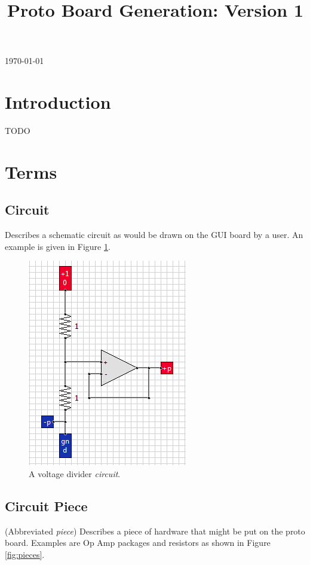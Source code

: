 \documentclass[12pt]{amsart}
\title{Proto Board Generation: Version 1}
\begin{document}
\today
\maketitle

\section{Introduction}

TODO

\section{Terms}

\subsection{Circuit}

Describes a schematic circuit as would be drawn on the GUI board by a user. An example is given in Figure \ref{fig:circuit}.

\begin{figure}
\includegraphics{Images/Circuit.png}
\caption{A voltage divider \emph{circuit}.}
\label{fig:circuit}
\end{figure}

\subsection{Circuit Piece}

(Abbreviated \emph{piece}) Describes a piece of hardware that might be put on the proto board. Examples are Op Amp packages and resistors as shown in Figure \ref{fig:pieces}.
\end{document}
